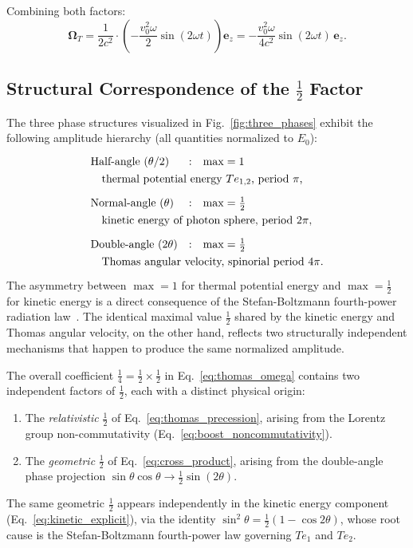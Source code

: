 \documentclass[%
 reprint,
 amsmath,amssymb,
 aps,
 prb,
]{revtex4-2}
\numberwithin{equation}{section}
\theoremstyle{definition}
\theoremstyle{remark}
\begin{document}
Combining both factors:
\begin{equation}
\bm{\Omega}_T
= \frac{1}{2c^2}\cdot\left(-\frac{v_0^2\omega}{2}\sin(2\omega t)\right)\bm{e}_z
= -\frac{v_0^2\omega}{4c^2}\sin(2\omega t)\,\bm{e}_z.
\label{eq:thomas_omega}
\end{equation}

\subsection*{Structural Correspondence of the $\frac{1}{2}$ Factor}
\label{sec:half_factor}

The three phase structures visualized in Fig.~\ref{fig:three_phases} exhibit the following amplitude hierarchy (all quantities normalized to $E_0$):
\begin{equation}
\renewcommand{\arraystretch}{1.3}
\begin{array}{lll}
\text{Half-angle } (\theta/2)  & : & \max = 1 \\
\multicolumn{3}{l}{\quad\text{thermal potential energy } Te_{1,2}\text{, period } \pi\text{,}} \\[6pt]
\text{Normal-angle } (\theta)  & : & \max = \tfrac{1}{2} \\
\multicolumn{3}{l}{\quad\text{kinetic energy of photon sphere, period } 2\pi\text{,}} \\[6pt]
\text{Double-angle } (2\theta) & : & \max = \tfrac{1}{2} \\
\multicolumn{3}{l}{\quad\text{Thomas angular velocity, spinorial period } 4\pi\text{.}}
\end{array}
\label{eq:amplitude_hierarchy}
\end{equation}
The asymmetry between $\max = 1$ for thermal potential energy and $\max = \frac{1}{2}$ for kinetic energy is a direct consequence of the Stefan-Boltzmann fourth-power radiation law~\cite{Hanamura_2018_01}. The identical maximal value $\frac{1}{2}$ shared by the kinetic energy and Thomas angular velocity, on the other hand, reflects two structurally independent mechanisms that happen to produce the same normalized amplitude.

The overall coefficient $\frac{1}{4} = \frac{1}{2}\times\frac{1}{2}$ in Eq.~\eqref{eq:thomas_omega} contains two independent factors of $\frac{1}{2}$, each with a distinct physical origin:
\begin{enumerate}
\item The \emph{relativistic} $\frac{1}{2}$ of Eq.~\eqref{eq:thomas_precession},
      arising from the Lorentz group non-commutativity (Eq.~\ref{eq:boost_noncommutativity}).
\item The \emph{geometric} $\frac{1}{2}$ of Eq.~\eqref{eq:cross_product},
      arising from the double-angle phase projection
      $\sin\theta\cos\theta \to \frac{1}{2}\sin(2\theta)$.
\end{enumerate}
The same geometric $\frac{1}{2}$ appears independently in the kinetic energy component (Eq.~\ref{eq:kinetic_explicit}), via the identity $\sin^2\theta = \frac{1}{2}(1-\cos 2\theta)$, whose root cause is the Stefan-Boltzmann fourth-power law governing $Te_1$ and $Te_2$.
\end{document}
